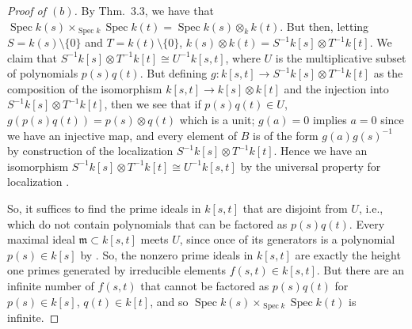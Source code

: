 \documentclass[10pt]{article}
\theoremstyle{definition}
\theoremstyle{remark}
\numberwithin{equation}{section}
\numberwithin{figure}{subsubsection}
\DeclareMathOperator{\Spec}{Spec}
\begin{document}
\begin{proof}[Proof of $(b)$]
  By Thm.~3.3, we have that $\Spec k(s) \times_{\Spec k} \Spec k(t) = \Spec k(s) \otimes_k k(t)$. But then, letting $S = k(s) \setminus \{0\}$ and $T = k(t) \setminus \{0\}$, $k(s) \otimes k(t) = S^{-1}k[s] \otimes T^{-1}k[t]$. We claim that $S^{-1}k[s] \otimes T^{-1}k[t] \cong U^{-1}k[s,t]$, where $U$ is the multiplicative subset of polynomials $p(s)q(t)$. But defining $g \colon k[s,t] \to S^{-1}k[s] \otimes T^{-1}k[t]$ as the composition of the isomorphism $k[s,t] \to k[s] \otimes k[t]$ and the injection into $S^{-1}k[s] \otimes T^{-1}k[t]$, then we see that if $p(s)q(t) \in U$, $g(p(s)q(t)) = p(s) \otimes q(t)$ which is a unit; $g(a) = 0$ implies $a = 0$ since we have an injective map, and every element of $B$ is of the form $g(a)g(s)^{-1}$ by construction of the localization $S^{-1}k[s] \otimes T^{-1}k[t]$. Hence we have an isomorphism $S^{-1}k[s] \otimes T^{-1}k[t] \cong U^{-1}k[s,t]$ by the universal property for localization \cite[Cor.~3.2]{AM69}.
  \par So, it suffices to find the prime ideals in $k[s,t]$ that are disjoint from $U$, i.e., which do not contain polynomials that can be factored as $p(s)q(t)$. Every maximal ideal $\mathfrak{m} \subset k[s,t]$ meets $U$, since once of its generators is a polynomial $p(s) \in k[s]$ by \cite[Prop.~1.5]{Rei95}. So, the nonzero prime ideals in $k[s,t]$ are exactly the height one primes generated by irreducible elements $f(s,t) \in k[s,t]$. But there are an infinite number of $f(s,t)$ that cannot be factored as $p(s)q(t)$ for $p(s) \in k[s]$, $q(t) \in k[t]$, and so $\Spec k(s) \times_{\Spec k} \Spec k(t)$ is infinite.
\end{proof}
\end{document}
